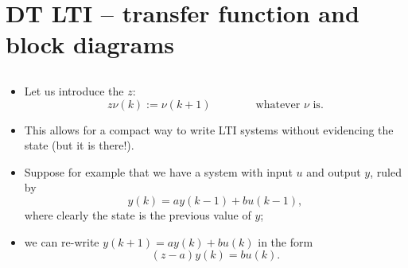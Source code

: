 \section{DT LTI -- transfer function and block diagrams}

\subsection{}

\begin{frame}
\myPause
 \begin{itemize}[<+-| alert@+>]
 \item Let us introduce the  $z$:
       \begin{displaymath}
        z\nu(k) := \nu(k+1) \qquad\qquad \text{whatever $\nu$ is}.
       \end{displaymath}
 \item This allows for a compact way to write LTI systems without evidencing the state (but it is there!).
 \item Suppose for example that we have a system with input $u$ and output $y$, ruled by
       \begin{displaymath}
        y(k) = ay(k-1)+bu(k-1),
       \end{displaymath}
       where clearly the state is the previous value of $y$;
 \item we can re-write $y(k+1)=ay(k)+bu(k)$ in the form
       \begin{displaymath}
        (z-a)y(k) = bu(k).
       \end{displaymath}
 \end{itemize}
\end{frame}


